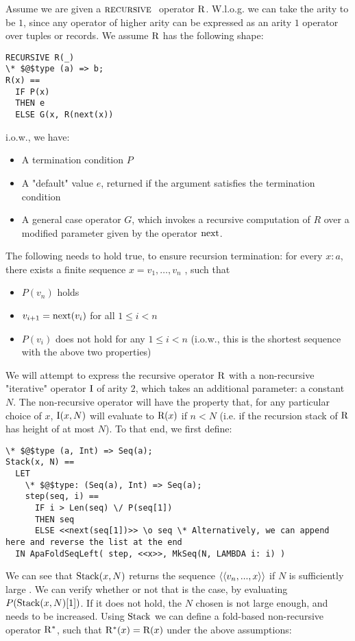 Assume we are given a $\textsc{recursive }$ operator $\mathrm{R}$. W.l.o.g. we can take the arity to be $1$, since any operator of higher arity can be expressed as an arity $1$ operator over tuples or records.
We assume $\mathrm{R}$ has the following shape:
\begin{lstlisting}[language=tla,columns=fullflexible]
RECURSIVE R(_)
\* $@$type (a) => b;
R(x) ==
  IF P(x)
  THEN e
  ELSE G(x, R(next(x))
\end{lstlisting}
%
i.o.w., we have:
\begin{itemize}
  \item A termination condition $P$
  \item A "default" value $e$, returned if the argument satisfies the termination condition
  \item A general case operator $G$, which invokes a recursive computation of $R$ over a modified parameter given by the operator $\mathrm{next}$.
\end{itemize}
%
The following needs to hold true, to ensure recursion termination: for every $x\colon a$, there exists a finite sequence $x = v_1, \dots, v_n$
, such that
\begin{itemize}
\item $P(v_n)$ holds
\item $v_{i+1} = \mathrm{next}(v_i)$ for all $1 \le i < n$
\item $P(v_i)$ does not hold for any $1 \le i < n$ (i.o.w., this is the shortest sequence with the above two properties)
\end{itemize}
%
We will attempt to express the recursive operator $\mathrm{R}$ with a non-recursive "iterative" operator $\mathrm{I}$ of arity $2$, which takes an additional parameter: a constant $N$. The non-recursive operator will have the property that, for any particular choice of $x$, $\mathrm{I}(x, N)$ will evaluate to $\mathrm{R}(x)$ if $n < N$ (i.e. if the recursion stack of $\mathrm{R}$ has height of at most $N$).
%
To that end, we first define:
\begin{lstlisting}[language=tla,columns=fullflexible]
\* $@$type (a, Int) => Seq(a);
Stack(x, N) ==
  LET 
    \* $@$type: (Seq(a), Int) => Seq(a);
    step(seq, i) ==
      IF i > Len(seq) \/ P(seq[1])
      THEN seq
      ELSE <<next(seq[1])>> \o seq \* Alternatively, we can append here and reverse the list at the end
  IN ApaFoldSeqLeft( step, <<x>>, MkSeq(N, LAMBDA i: i) )
\end{lstlisting}
%
We can see that $\mathrm{Stack}(x,N)$
 returns the sequence $\left<\left<v_n, ..., x\right>\right>$ if $N$ is sufficiently large
. 
We can verify whether or not that is the case, by evaluating $P(\mathrm{Stack}(x, N)[1])$. If it does not hold, the $N$ chosen is not large enough, and needs to be increased. Using $\mathrm{Stack}$ we can define a fold-based non-recursive operator $\mathrm{R}^*$, such that $\mathrm{R}^*(x) = \mathrm{R}(x)$ under the above assumptions:

